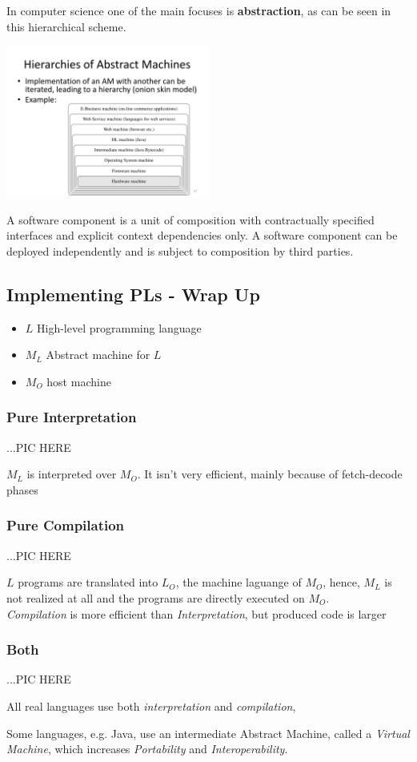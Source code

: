In computer science one of the main focuses is \textbf{abstraction},
as can be seen in this hierarchical scheme.
\begin{center}
\includegraphics[width=0.5\textwidth]{images/machines_hierarchy.png}
\end{center}A software component is a unit of composition with
contractually specified interfaces and explicit context
dependencies only. A software component can be
deployed independently and is subject to
composition by third parties.

\subsection*{Implementing PLs - Wrap Up}
\begin{itemize}
    \item $L$ High-level programming language
    \item $M_L$ Abstract machine for $L$
    \item $M_O$ host machine
\end{itemize}

\subsubsection{Pure Interpretation}

...PIC HERE

$M_L$ is interpreted over $M_O$.
It isn't very efficient, mainly because of fetch-decode phases

\subsubsection{Pure Compilation}

...PIC HERE

$L$ programs are translated into $L_O$, the machine laguange of $M_O$,
hence, $M_L$ is not realized at all and the programs are directly executed on $M_O$.\\
\textit{Compilation} is more efficient than \textit{Interpretation}, 
but produced code is larger

\subsubsection{Both}

...PIC HERE

All real languages use both \textit{interpretation} and \textit{compilation}, 

Some languages, e.g. Java, use an intermediate Abstract Machine, called a \textit{Virtual Machine},
which increases \textit{Portability} and \textit{Interoperability}.

